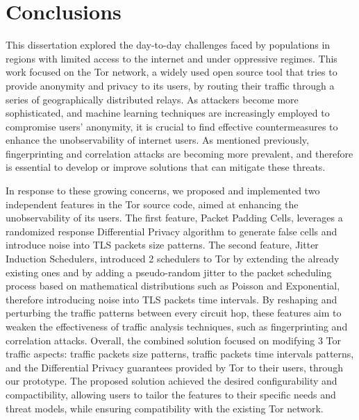 
%

\chapter{Conclusions}\label{cha:conclusions}

This dissertation explored the day-to-day challenges faced by populations in regions with limited access to the internet and under oppressive regimes. This work focused on the Tor network, a widely used open source tool that tries to provide anonymity and privacy to its users, by routing their traffic through a series of geographically distributed relays. As attackers become more sophisticated, and machine learning techniques are increasingly employed to compromise users' anonymity, it is crucial to find effective countermeasures to enhance the unobservability of internet users. As mentioned previously, fingerprinting and correlation attacks are becoming more prevalent, and therefore is essential to develop or improve solutions that can mitigate these threats.

In response to these growing concerns, we proposed and implemented two independent features in the Tor source code, aimed at enhancing the unobservability of its users. The first feature, Packet Padding Cells, leverages a randomized response Differential Privacy algorithm to generate false cells and introduce noise into TLS packets size patterns. The second feature, Jitter Induction Schedulers, introduced 2 schedulers to Tor by extending the already existing ones and by adding a pseudo-random jitter to the packet scheduling process based on mathematical distributions such as Poisson and Exponential, therefore introducing noise into TLS packets time intervals. By reshaping and perturbing the traffic patterns between every circuit hop, these features aim to weaken the effectiveness of traffic analysis techniques, such as fingerprinting and correlation attacks. Overall, the combined solution focused on modifying 3 Tor traffic aspects: traffic packets size patterns, traffic packets time intervals patterns, and the Differential Privacy guarantees provided by Tor to their users, through our prototype. The proposed solution achieved the desired configurability and compactibility, allowing users to tailor the features to their specific needs and threat models, while ensuring compatibility with the existing Tor network.

